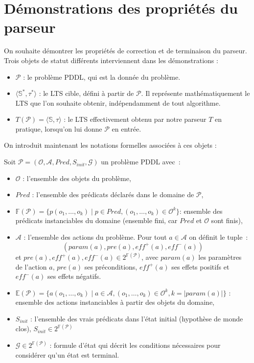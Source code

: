 

\section{Démonstrations des propriétés du parseur}\label{demo_pars}

On souhaite démontrer les propriétés de correction et de terminaison du parseur. Trois objets de statut différents interviennent dans les démonstrations :

\begin{itemize}
    \item $\mathcal{P}$ : le problème PDDL, qui est la donnée du problème.
    \item $\langle \mathds{S}^*, \tau^* \rangle$ : le LTS cible, défini à partir de $\mathcal{P}$. Il représente mathématiquement le LTS que l'on souhaite obtenir, indépendamment de tout algorithme.
    \item $T(\mathcal{P}) = \langle \mathds{S}, \tau \rangle$ : le LTS effectivement obtenu par notre parseur $T$ en pratique, lorsqu'on lui donne $\mathcal{P}$ en entrée.
\end{itemize}

On introduit maintenant les notations formelles associées à ces objets :

Soit $\mathcal{P} = (\mathcal{O}, \mathcal{A}, Pred, S_{init}, \mathcal{G})$ un problème PDDL avec :
\begin{itemize}
    \item $\mathcal{O}$ : l'ensemble des objets du problème,
    \item $Pred$ : l'ensemble des prédicats déclarés dans le domaine de $\mathcal{P}$,
    \item $\mathds{F}(\mathcal{P}) = \{ p(o_1,\dots,o_k) \mid p\in Pred, (o_1, \dots,o_k) \in \mathcal{O}^k\}$: ensemble des prédicats instanciables du domaine (ensemble fini, car $Pred$ et $\mathcal{O}$ sont finis),
    \item $\mathcal{A}$ : l'ensemble des actions du problème. Pour tout $a\in \mathcal{A}$ on définit le tuple :  $$(param(a),pre(a),eff^+(a),eff^-(a))$$
    et $pre(a),eff^+(a),eff^-(a) \in 2^{\mathds{F}(\mathcal{P})}$, avec $param(a)$ les paramètres de l'action $a$,  $pre(a)$ ses préconditions, $eff^+(a)$ ses effets positifs et $eff^-(a)$ ses effets négatifs.

    \item $\mathds{E}(\mathcal{P}) = \{ a(o_1,\dots, o_k) \mid a \in \mathcal{A}, (o_1, \dots,o_k) \in \mathcal{O}^k, k = \lvert param(a) \rvert \}$ : ensemble des actions instanciables à partir des objets du domaine,
    
    \item $S_{init}$ : l'ensemble des vrais prédicats dans l'état initial (hypothèse de monde clos), $S_{init} \in 2^{\mathds{F}(\mathcal{P})}$
    
    \item $\mathcal{G} \in 2^{\mathds{F}(\mathcal{P})}$ : formule d'état qui décrit les conditions nécessaires pour considérer qu'un état est terminal.
\end{itemize}

